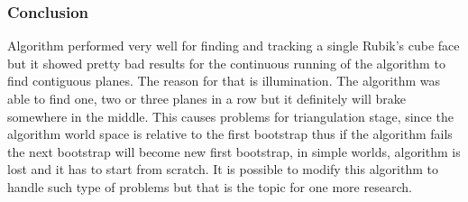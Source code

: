 \documentclass[../../main]{subfiles}
\begin{document}
\subsubsection{Conclusion}

Algorithm performed very well for finding and tracking a single Rubik's cube face but it showed pretty bad results for the continuous running of the algorithm to find contiguous planes. The reason for that is illumination. The algorithm was able to find one, two or three planes in a row but it definitely will brake somewhere in the middle. This causes problems for triangulation stage, since the algorithm world space is relative to the first bootstrap thus if the algorithm fails the next bootstrap will become new first bootstrap, in simple worlds, algorithm is lost and it has to start from scratch. It is possible to modify this algorithm to handle such type of problems but that is the topic for one more research.
\end{document}

